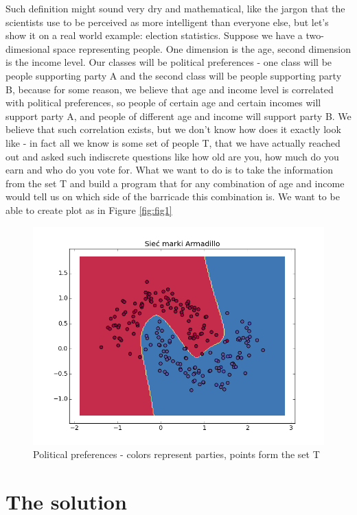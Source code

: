 \documentclass[3p,twocolumn]{elsarticle}
\begin{document}
Such definition might sound very dry and mathematical, like the jargon that the scientists use to be perceived as more intelligent than everyone else, but let's show it on a real world example: election statistics. Suppose we have a two-dimesional space representing people. One dimension is the age, second dimension is the income level. Our classes will be political preferences - one class will be people supporting party A and the second class will be people supporting party B, because for some reason, we believe that age and income level is correlated with political preferences, so people of certain age and certain incomes will support party A, and people of different age and income will support party B. We believe that such correlation exists, but we don't know how does it exactly look like - in fact all we know is some set of people T, that we have actually reached out and asked such indiscrete questions like how old are you, how much do you earn and who do you vote for. What we want to do is to take the information from the set T and build a program that for any combination of age and income would tell us on which side of the barricade this combination is. We want to be able to create plot as in Figure \ref{fig:fig1}

\begin{figure}[fig1]
	
\label{fig:fig1}
  \includegraphics[width=\linewidth]{figure_1.png}
	\caption{Political preferences - colors represent parties, points form the set T}
	\label{fig1}
\end{figure}


\section{The solution}
\end{document}
